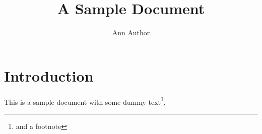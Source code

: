 \documentclass{scrreprt}
\title{A Sample Document}
\author{Ann Author}
\begin{document}
\maketitle
\tableofcontents

\chapter{Introduction}

This is a sample document with some dummy 
text\footnote{and a footnote}.
\end{document}
